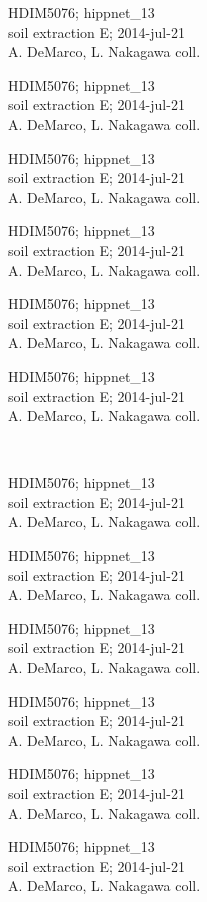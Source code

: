 \documentclass[2pt]{extarticle}
\begin{document}
\noindent
\parbox{0.16\textwidth}{\tiny \raggedright \rule[-0.3\baselineskip]{0pt}{10pt}HDIM5076; hippnet\_13\\ soil extraction E; 2014-jul-21\\ A. DeMarco, L. Nakagawa coll.}
\parbox{0.16\textwidth}{\tiny \raggedright \rule[-0.3\baselineskip]{0pt}{10pt}HDIM5076; hippnet\_13\\ soil extraction E; 2014-jul-21\\ A. DeMarco, L. Nakagawa coll.}
\parbox{0.16\textwidth}{\tiny \raggedright \rule[-0.3\baselineskip]{0pt}{10pt}HDIM5076; hippnet\_13\\ soil extraction E; 2014-jul-21\\ A. DeMarco, L. Nakagawa coll.}
\parbox{0.16\textwidth}{\tiny \raggedright \rule[-0.3\baselineskip]{0pt}{10pt}HDIM5076; hippnet\_13\\ soil extraction E; 2014-jul-21\\ A. DeMarco, L. Nakagawa coll.}
\parbox{0.16\textwidth}{\tiny \raggedright \rule[-0.3\baselineskip]{0pt}{10pt}HDIM5076; hippnet\_13\\ soil extraction E; 2014-jul-21\\ A. DeMarco, L. Nakagawa coll.}
\parbox{0.16\textwidth}{\tiny \raggedright \rule[-0.3\baselineskip]{0pt}{10pt}HDIM5076; hippnet\_13\\ soil extraction E; 2014-jul-21\\ A. DeMarco, L. Nakagawa coll.} \\ 
\vspace{0.001in} 

\noindent
\parbox{0.16\textwidth}{\tiny \raggedright \rule[-0.3\baselineskip]{0pt}{10pt}HDIM5076; hippnet\_13\\ soil extraction E; 2014-jul-21\\ A. DeMarco, L. Nakagawa coll.}
\parbox{0.16\textwidth}{\tiny \raggedright \rule[-0.3\baselineskip]{0pt}{10pt}HDIM5076; hippnet\_13\\ soil extraction E; 2014-jul-21\\ A. DeMarco, L. Nakagawa coll.}
\parbox{0.16\textwidth}{\tiny \raggedright \rule[-0.3\baselineskip]{0pt}{10pt}HDIM5076; hippnet\_13\\ soil extraction E; 2014-jul-21\\ A. DeMarco, L. Nakagawa coll.}
\parbox{0.16\textwidth}{\tiny \raggedright \rule[-0.3\baselineskip]{0pt}{10pt}HDIM5076; hippnet\_13\\ soil extraction E; 2014-jul-21\\ A. DeMarco, L. Nakagawa coll.}
\parbox{0.16\textwidth}{\tiny \raggedright \rule[-0.3\baselineskip]{0pt}{10pt}HDIM5076; hippnet\_13\\ soil extraction E; 2014-jul-21\\ A. DeMarco, L. Nakagawa coll.}
\parbox{0.16\textwidth}{\tiny \raggedright \rule[-0.3\baselineskip]{0pt}{10pt}HDIM5076; hippnet\_13\\ soil extraction E; 2014-jul-21\\ A. DeMarco, L. Nakagawa coll.} \\ 
\vspace{0.001in} 
\end{document}
